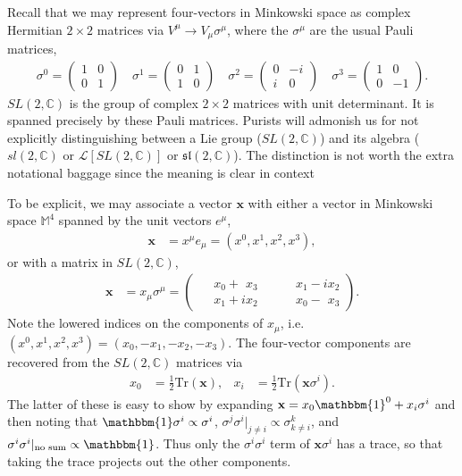 \documentclass[12pt]{article}
\numberwithin{equation}{section}    %
\begin{document}
Recall that we may represent four-vectors in Minkowski space as complex Hermitian $2\times 2$ matrices via $V^\mu \rightarrow V_\mu\sigma^\mu$, where the $\sigma^\mu$ are the usual Pauli matrices,
\begin{align}
	\sigma^0 = 
	\begin{pmatrix}
		1 & 0\\
		0 & 1
	\end{pmatrix}
	\quad
	\sigma^1 = 
	\begin{pmatrix}
		0 & 1\\
		1 & 0
	\end{pmatrix}
	\quad
	\sigma^2 = 
	\begin{pmatrix}
		0 & -i\\
		i & 0
	\end{pmatrix}
	\quad
	\sigma^3 = 
	\begin{pmatrix}
		1 & 0\\
		0 & -1
	\end{pmatrix}.\label{eq:SUSYalg:pauli:matrices}
\end{align}
$SL(2,\mathbb C)$ is the group of complex $2\times 2$ matrices with unit determinant. It is spanned precisely by these Pauli matrices. 
Purists will admonish us for not explicitly distinguishing between a Lie group ($SL(2,\mathbb{C})$) and its algebra ($sl(2,\mathbb{C})$ or $\mathcal{L}[SL(2,\mathbb{C})]$ or $\mathfrak{sl}(2,\mathbb{C})$). The distinction is not worth the extra notational baggage since the meaning is clear in context


To be explicit, we may associate a vector $\mathbf x$ with either a vector in Minkowski space $\mathbb M^4$ spanned by the unit vectors $e^\mu$,
\begin{align}
	\mathbf x &= x^\mu e_\mu = \left(x^0,x^1,x^2,x^3\right),\label{eq:susyalg:vectorrep}
\end{align}
	or with a matrix in $SL(2,\mathbb C)$,
\begin{align}
	\mathbf x &= x_\mu \sigma^\mu
			  = \begin{pmatrix}
			  	\phantom+x_0 + \phantom{i} x_3 &\quad \phantom+ x_1-ix_2\\
				\phantom+x_1+ix_2 &\quad \phantom+ x_0-\phantom{i} x_3
			  \end{pmatrix}.\label{eq:susyalg:sl2crep}
\end{align}
Note the lowered indices on the components of $x_\mu$, i.e. $(x^0,x^1,x^2,x^3) = (x_0,-x_1,-x_2,-x_3)$. The four-vector components are recovered from the $SL(2,\mathbb C)$ matrices via
\begin{align}
	x_0 &= \frac 12\text{Tr}(\mathbf{x}), & x_i &= \frac 12\text{Tr}(\mathbf{x}\sigma^i).\label{eq:SUSYalg:sl2ctom4}
\end{align}
The latter of these is easy to show by expanding $\mathbf{x} = x_0\mathbbm{1}^0 + x_i\sigma^i$ and then noting that $\mathbbm{1}\sigma^i \propto \sigma^i$, $\sigma^j\sigma^i|_{j\neq i}\propto \sigma^k_{k\neq i}$, and $\sigma^i\sigma^i|_{\text{no sum}}\propto \mathbbm{1}$. Thus only the $\sigma^i\sigma^i$ term of $\mathbf{x}\sigma^i$ has a trace, so that taking the trace projects out the other components.
\end{document}
